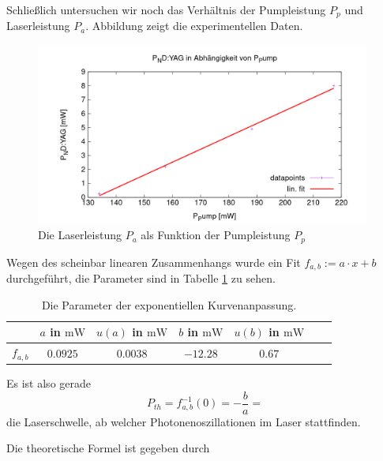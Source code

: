 \documentclass[../../../main.tex]{subfiles}
\begin{document}
    Schließlich untersuchen wir noch das Verhältnis der Pumpleistung $P_p$ und Laserleistung $P_a$. Abbildung zeigt die experimentellen Daten.

    \begin{figure}[H]
        \centering
        \includegraphics[width=11cm]{../../Bilddateien/5/P(NDYAG)overP(Pump).png}
        \caption{Die Laserleistung $P_a$ als Funktion der Pumpleistung $P_p$}
        \label{fig:PumpLaserLeistung}
    \end{figure}

    Wegen des scheinbar linearen Zusammenhangs wurde ein Fit $f_{a,b} := a\cdot x + b$ durchgeführt, die Parameter sind in Tabelle \ref{tab:PumpLaserLeistungFitParameter} zu sehen.

    \begin{table}[H]
        \centering
        \begin{tabular}{c|cc|cc|cc}
            \hline
             & $a$ in $\si{\m\W}$ & $u(a)$ in $\si{\m\W}$ & $b$ in $\si{\m\W}$ & $u(b)$ in $\si{\m\W}$ \\
            \hline\hline
            $f_{a, b}$ & $0.0925$ & $0.0038$ & $-12.28$ & $0.67$\\
            \hline
        \end{tabular}
        \caption{Die Parameter der exponentiellen Kurvenanpassung.}
        \label{tab:PumpLaserLeistungFitParameter}
    \end{table}

    Es ist also gerade
    \[
        P_{th} = f^{-1}_{a, b}(0) = -\frac{b}{a} =
    \]
    die Laserschwelle, ab welcher Photonenoszillationen im Laser stattfinden.

    Die theoretische Formel ist gegeben durch 
\end{document}

